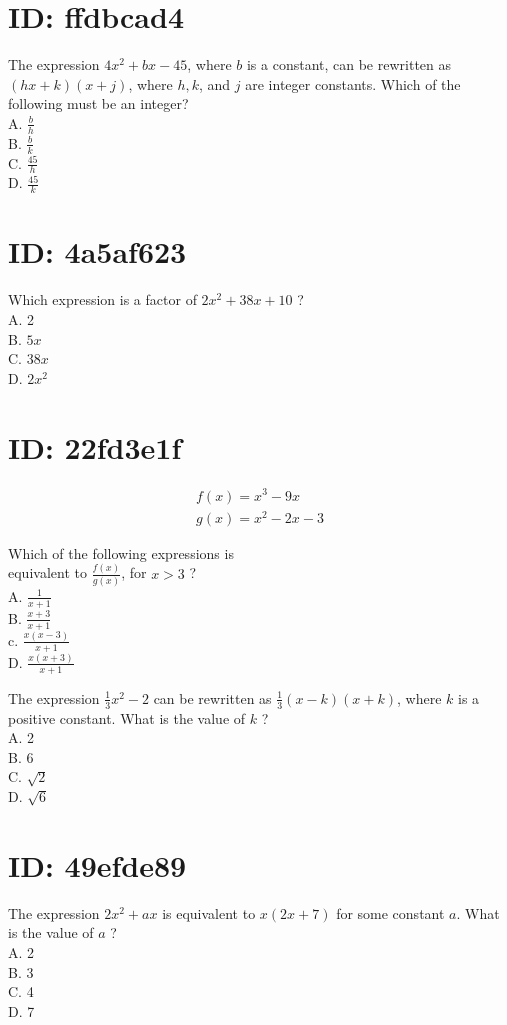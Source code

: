 \section*{ID: ffdbcad4}
The expression $4 x^{2}+b x-45$, where $b$ is a constant, can be rewritten as $(h x+k)(x+j)$, where $h, k$, and $j$ are integer constants. Which of the following must be an integer?\\
A. $\frac{b}{h}$\\
B. $\frac{b}{k}$\\
C. $\frac{45}{h}$\\
D. $\frac{45}{k}$

\section*{ID: 4a5af623}
Which expression is a factor of $2 x^{2}+38 x+10$ ?\\
A. 2\\
B. $5 x$\\
C. $38 x$\\
D. $2 x^{2}$

\section*{ID: 22fd3e1f}
$$
\begin{gathered}
f(x)=x^{3}-9 x \\
g(x)=x^{2}-2 x-3
\end{gathered}
$$

Which of the following expressions is\\
equivalent to $\frac{f(x)}{g(x)}$, for $x>3$ ?\\
A. $\frac{1}{x+1}$\\
B. $\frac{x+3}{x+1}$\\
c. $\frac{x(x-3)}{x+1}$\\
D. $\frac{x(x+3)}{x+1}$

The expression $\frac{1}{3} x^{2}-2$ can be rewritten as $\frac{1}{3}(x-k)(x+k)$, where $k$ is a positive constant. What is the value of $k$ ?\\
A. 2\\
B. 6\\
C. $\sqrt{2}$\\
D. $\sqrt{6}$

\section*{ID: 49efde89}
The expression $2 x^{2}+a x$ is equivalent to $x(2 x+7)$ for some constant $a$. What is the value of $a$ ?\\
A. 2\\
B. 3\\
C. 4\\
D. 7

